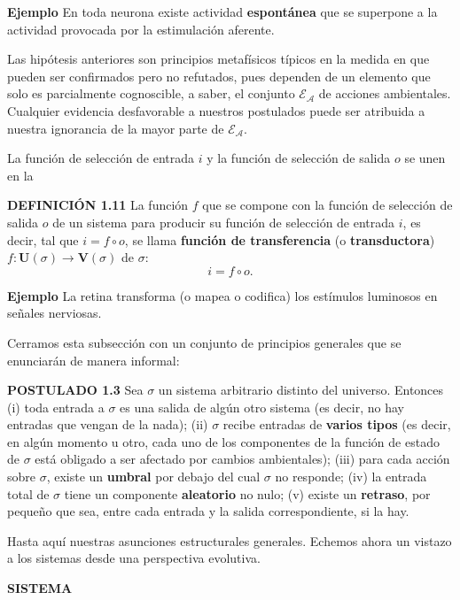 {\fontsize{13}{15}\selectfont
\textbf{Ejemplo} En toda neurona existe actividad \textbf{espontánea} que se superpone a la actividad provocada por la estimulación aferente.

Las hipótesis anteriores son principios metafísicos típicos en la medida en que pueden ser confirmados pero no refutados, pues dependen de un elemento que solo es parcialmente cognoscible, a saber, el conjunto $\mathcal{E}_{\mathcal{A}}$ de acciones ambientales. Cualquier evidencia desfavorable a nuestros postulados puede ser atribuida a nuestra ignorancia de la mayor parte de $\mathcal{E}_{\mathcal{A}}$.

La función de selección de entrada $i$ y la función de selección de salida $o$ se unen en la

\textbf{DEFINICIÓN 1.11} La función $f$ que se compone con la función de selección de salida $o$ de un sistema para producir su función de selección de entrada $i$, es decir, tal que $i = f \circ o$, se llama \textbf{función de transferencia} (o \textbf{transductora}) $f: \mathbf{U}(\sigma) \longrightarrow \mathbf{V}(\sigma)$ de $\sigma$:
$$ i = f \circ o. $$

\textbf{Ejemplo} La retina transforma (o mapea o codifica) los estímulos luminosos en señales nerviosas.

Cerramos esta subsección con un conjunto de principios generales que se enunciarán de manera informal:

\textbf{POSTULADO 1.3} Sea $\sigma$ un sistema arbitrario distinto del universo. Entonces
(i) toda entrada a $\sigma$ es una salida de algún otro sistema (es decir, no hay entradas que vengan de la nada);
(ii) $\sigma$ recibe entradas de \textbf{varios tipos} (es decir, en algún momento u otro, cada uno de los componentes de la función de estado de $\sigma$ está obligado a ser afectado por cambios ambientales);
(iii) para cada acción sobre $\sigma$, existe un \textbf{umbral} por debajo del cual $\sigma$ no responde;
(iv) la entrada total de $\sigma$ tiene un componente \textbf{aleatorio} no nulo;
(v) existe un \textbf{retraso}, por pequeño que sea, entre cada entrada y la salida correspondiente, si la hay.

Hasta aquí nuestras asunciones estructurales generales. Echemos ahora un vistazo a los sistemas desde una perspectiva evolutiva.
}
\newpage
\fancyhf{}
\fancyhead[r]{\thepage}
\begin{center}
{\fontsize{16}{18}\selectfont \textbf{SISTEMA}}
\end{center}
\vspace{0.5cm}

